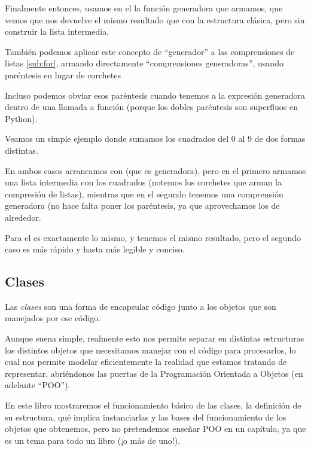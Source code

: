 Finalmente entonces, usamos en el  la función generadora que armamos, que vemos que nos devuelve el mismo resultado que con la estructura clásica, pero sin construir la lista intermedia.

También podemos aplicar este concepto de ``generador'' a las comprensiones de listas \ref{sub:for}, armando directamente ``comprensiones generadoras'', usando paréntesis en lugar de corchetes


Incluso podemos obviar esos paréntesis cuando tenemos a la expresión generadora dentro de una llamada a función (porque los dobles paréntesis son superfluos en Python).

Veamos un simple ejemplo donde sumamos los cuadrados del 0 al 9 de dos formas distintas. 


En ambos casos arrancamos con  (que es generadora), pero en el primero armamos una lista intermedia con los cuadrados (notemos los corchetes que arman la compresión de listas), mientras que en el segundo tenemos una comprensión generadora (no hace falta poner los paréntesis, ya que aprovechamos los de alrededor.

Para el  es exactamente lo mismo, y tenemos el mismo resultado, pero el segundo caso es más rápido y hasta más legible y conciso.


\subsection{Clases}\label{sub:clases}

Las \textit{clases} son una forma de encapsular código junto a los objetos que son manejados por ese código.

Aunque suena simple, realmente esto nos permite separar en distintas estructuras los distintos objetos que necesitamos manejar con el código para procesarlos, lo cual nos permite modelar eficientemente la realidad que estamos tratando de representar, abriéndonos las puertas de la Programación Orientada a Objetos (en adelante ``POO'').

En este libro mostraremos el funcionamiento básico de las clases, la definición de su estructura, qué implica instanciarlas y las bases del funcionamiento de los objetos que obtenemos, pero no pretendemos enseñar POO en un capítulo, ya que es un tema para todo un libro (¡o más de uno!).

